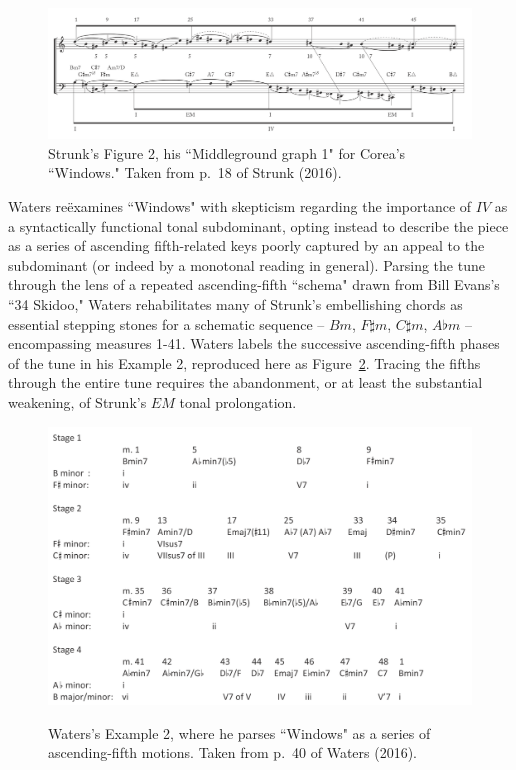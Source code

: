 \begin{figure}
	\centering
	\caption{Strunk's Figure 2, his ``Middleground graph 1" for Corea's ``Windows."  Taken from p.\ 18 of Strunk (2016).}\label{strunk_fig}
	\includegraphics[width=6in]{strunk_windows1.png}
\end{figure}

Waters re\"{e}xamines ``Windows" with skepticism regarding the importance of $IV$ as a syntactically functional tonal subdominant, opting instead to describe the piece as a series of ascending fifth-related keys poorly captured by an appeal to the subdominant (or indeed by a monotonal reading in general).  Parsing the tune through the lens of a repeated ascending-fifth ``schema" drawn from Bill Evans's ``34 Skidoo," Waters rehabilitates many of Strunk's embellishing chords as essential stepping stones for a schematic sequence -- $Bm$, $F\sharp m$, $C\sharp m$, $A\flat m$ -- encompassing measures 1-41.  Waters labels the successive ascending-fifth phases of the tune in his Example 2, reproduced here as Figure~\ref{waters_fig}.  Tracing the fifths through the entire tune requires the abandonment, or at least the substantial weakening, of Strunk's $EM$ tonal prolongation.

\begin{figure}
	\centering
	\caption{Waters's Example 2, where he parses ``Windows" as a series of ascending-fifth motions.  Taken from p.\ 40 of Waters (2016).}
	\includegraphics[width=6in]{waters_windows.png}
	\label{waters_fig}
\end{figure}

